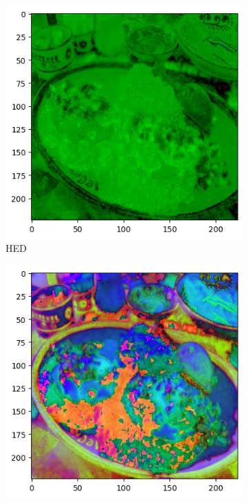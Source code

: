 \begin{figure}[htbp]
  \centering

  \begin{subfigure}[b]{0.22\textwidth}
    \includegraphics[width=\textwidth]{graphics/images/colorspaces/hed.png}
    \caption{HED}
    \label{fig:hed}
  \end{subfigure}
  \hfill
  \begin{subfigure}[b]{0.22\textwidth}
    \includegraphics[width=\textwidth]{graphics/images/colorspaces/hsv.png}

\end{subfigure}
\end{figure}
